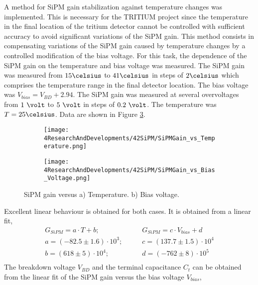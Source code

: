 A method for SiPM gain stabilization against temperature changes was implemented. This is necessary for the TRITIUM project since the temperature in the final location of the tritium detector cannot be controlled with sufficient accuracy to avoid significant variations of the SiPM gain. This method consists in compensating variations of the SiPM gain caused by temperature changes by a controlled modification of the bias voltage. For this task, the dependence of the SiPM gain on the temperature and bias voltage was measured. The SiPM gain was measured from $15\celsius$ to $41\celsius$ in steps of $2\celsius$ which comprises the temperature range in the final detector location. The bias voltage was $V_{bias} = V_{BD}+2.94$. The SiPM gain was measured at several overvoltages from $1~\volt$ to $5~\volt$ in steps of $0.2~\volt$. The temperature was $T=25\celsius$. Data  are shown in Figure \ref{fig:SiPMGainDependance}.
\begin{figure}
\centering
    \begin{subfigure}[b]{0.9\textwidth}
    \centering
    \texttt{[image: 4ResearchAndDevelopments/42SiPM/SiPMGain\_vs\_Temperature.png]}  
    \caption{\label{subfig:SiPMGainvsTemperature}}
    \end{subfigure}
    \hfill
    \begin{subfigure}[b]{0.9\textwidth}
    \centering
    \texttt{[image: 4ResearchAndDevelopments/42SiPM/SiPMGain\_vs\_Bias\_Voltage.png]}  
    \caption{\label{subfig:SiPMGainvsBiasVoltage}}
    \end{subfigure}
 \caption{SiPM gain versus a) Temperature. b) Bias voltage.}
 \label{fig:SiPMGainDependance}
\end{figure}
Excellent linear behaviour is obtained for both cases. It is obtained from a linear fit,
\begin{equation*}
\begin{split}
G_{SiPM}=a \cdot{} T + b;& \qquad G_{SiPM}=c \cdot{} V_{bias} + d\\
a=\left( -82.5 \pm 1.6 \right) \cdot{} 10^{3};& \qquad c=\left( 137.7 \pm 1.5 \right) \cdot{} 10^{4}\\
b=\left( 618 \pm 5 \right) \cdot{} 10^{4};& \qquad d=\left( -762 \pm 8 \right) \cdot{} 10^{5} \\
\label{SiPMGainVSTempV}
\end{split}
\end{equation*} 
The breakdown voltage $V_{BD}$ and the terminal capacitance $C_t$ can be obtained from the linear fit of the SiPM gain versus the bias voltage $V_{bias}$,
